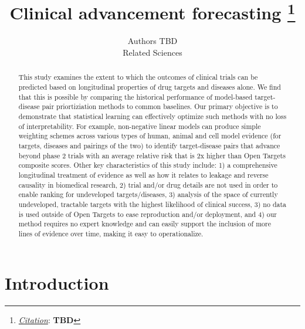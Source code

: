 \documentclass{article}
\title{Clinical advancement forecasting
\thanks{\textit{\underline{Citation}}: 
\textbf{TBD}} 
}
\author{
  Authors TBD \\
  Related Sciences \\
}
\begin{document}
\maketitle

\begin{abstract}
This study examines the extent to which the outcomes of clinical trials can be predicted based on longitudinal properties of drug targets and diseases alone. We find that this is possible by comparing the historical performance of model-based target-disease pair priortiziation methods to common baselines. Our primary objective is to demonstrate that statistical learning can effectively optimize such methods with no loss of interpretability. For example, non-negative linear models can produce simple weighting schemes across various types of human, animal and cell model evidence (for targets, diseases and pairings of the two) to identify target-disease pairs that advance beyond phase 2 trials with an average relative risk that is 2x higher than Open Targets composite scores. Other key characteristics of this study include: 1) a comprehensive longitudinal treatment of evidence as well as how it relates to leakage and reverse causality in biomedical research, 2) trial and/or drug details are not used in order to enable ranking for undeveloped targets/diseases, 3) analysis of the space of currently undeveloped, tractable targets with the highest likelihood of clinical success, 3) no data is used outside of Open Targets to ease reproduction and/or deployment, and 4) our method requires no expert knowledge and can easily support the inclusion of more lines of evidence over time, making it easy to operationalize.
\end{abstract}

\section{Introduction}
\end{document}
